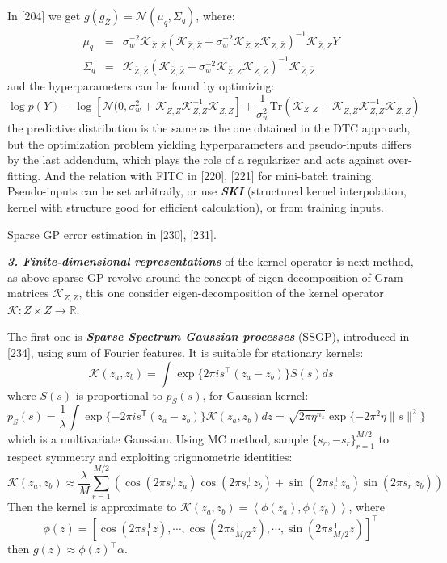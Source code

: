 \documentclass[10pt]{elegantbook}
\newcommand{\mydefination}[1]{\textbf{\textit{\textcolor{structurecolor}{#1}}}}
\begin{document}
In [204] we get $g(g_{\bar Z}) = \mathcal N(\mu_q, \Sigma_q)$, where:
\[
\begin{array}{lll}
    \mu_{q} &=& \sigma_{w}^{-2}\mathscr{K}_{\bar{Z}, \bar{Z}}(\mathscr{K}_{\bar{Z}, \bar{Z}}+\sigma_{w}^{-2}\mathscr{K}_{\bar{Z}, Z}\mathscr{K}_{Z, \bar{Z}})^{-1}\mathscr{K}_{\bar{Z}, Z}Y \\
    \Sigma_q &=& \mathscr{K}_{\bar{Z}, \bar{Z}} (\mathscr{K}_{\bar{Z}, \bar{Z}} + \sigma_{w}^{-2}\mathscr{K}_{\bar{Z}, Z}\mathscr{K}_{Z, \bar{Z}})^{-1} \mathscr{K}_{\bar{Z}, \bar{Z}}
\end{array}
\]
and the hyperparameters can be found by optimizing:
\[
\log p(Y) - \log [ \mathcal N(0,\sigma_{w}^{2}+\mathscr{K}_{Z, \bar{Z}} \mathscr{K}_{\bar{Z}, \bar{Z}}^{-1} \mathscr{K}_{\bar{Z}, Z} ] + \frac{1}{\sigma^2_w} 
\text{Tr}(\mathscr{K}_{Z, Z} - \mathscr{K}_{Z, \bar{Z}} \mathscr{K}_{\bar{Z}, \bar{Z}}^{-1} \mathscr{K}_{\bar{Z}, Z})
\]
the predictive distribution is the same as the one obtained in the DTC approach, but the optimization problem yielding 
hyperparameters and pseudo-inputs differs by the last  addendum, which plays the role of a regularizer and
acts against over-fitting. And the relation with FITC in [220], [221] for mini-batch training. Pseudo-inputs can be set 
arbitraily, or use \mydefination{SKI} (structured kernel interpolation, kernel with structure good for efficient calculation), 
or from training inputs.

Sparse GP error estimation in [230], [231].

\mydefination{3. Finite-dimensional representations} of the kernel operator is next method, as above sparse GP revolve
around the concept of eigen-decomposition of Gram matrices $\mathscr{K}_{Z, Z}$, this one consider eigen-decomposition of the kernel operator
$\mathscr{K}: Z \times Z \rightarrow \mathbb R$. 

The first one is \mydefination{Sparse Spectrum Gaussian processes} (SSGP), introduced in [234], using sum of Fourier features. 
It is suitable for stationary kernels:
\[
\mathscr{K}(z_a, z_b) = \int \exp \{ 2 \pi i s^{\top} (z_a - z_b) \} S(s)ds
\]
where $S(s)$ is proportional to $p_S(s)$, for Gaussian kernel:
\[
p_{S}(s)= \frac{1}{\lambda} \int \exp\{-2\pi i s^{\mathsf{T}}(z_{a}-z_{b})\}{\mathscr{K}}(z_{a},z_{b})d z = \sqrt{2\pi\eta^{n_{z}}}\exp\{-2\pi^{2}\eta \| s \|^{2}\}
\]
which is a multivariate Gaussian. Using MC method, sample $\{ s_r, -s_r \}_{r=1}^{M/2}$ to respect symmetry and exploiting 
trigonometric identities:
\[
\mathscr{K}(z_{a},z_{b})\approx\frac{\lambda}{M}\sum_{r=1}^{M/2} \left (\cos(2\pi s_{r}^{\top}z_{a})\cos(2\pi 
s_{r}^{\top}z_{b}) + \sin(2\pi s_r^{\top} z_a) \sin(2\pi s_r^{\top} z_b) \right )
\]
Then the kernel is approximate to $\mathscr{K}(z_{a},z_{b}) = \left\langle\phi(z_{a}),\phi(z_{b})\right\rangle$, where 
\[
\phi(z) = [\cos(2\pi s_{1}^{\textsf{T}}z),\cdots,\cos(2\pi s_{M/2}^{\textsf{T}}z),\cdots ,\sin(2\pi s_{M/2}^{\textsf{T}}z)]^{\top}
\]
then $g(z) \approx \phi(z)^{\top} \alpha$.
\end{document}
